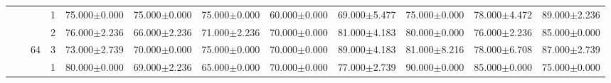 \begin{table}[htpb]
{\begin{tabular}{c|c|c|c|rr|rr|rr|rr}
                                 &                                                                                 &                                                                                        & 1                                                                                         & 75.000$\pm$0.000                        & 75.000$\pm$0.000                        & 75.000$\pm$0.000                        & 60.000$\pm$0.000                        & 69.000$\pm$5.477                         & 75.000$\pm$0.000                         & 78.000$\pm$4.472                        & 89.000$\pm$2.236                       \\
                                 &                                                                                 &                                                                                        & 2                                                                                         & 76.000$\pm$2.236                        & 66.000$\pm$2.236                        & 71.000$\pm$2.236                        & 70.000$\pm$0.000                        & 81.000$\pm$4.183                         & 80.000$\pm$0.000                         & 76.000$\pm$2.236                        & 85.000$\pm$0.000                       \\
                                 &                                                                                 & \multirow{-3}{*}{64}                                                                   & 3                                                                                         & 73.000$\pm$2.739                        & 70.000$\pm$0.000                        & 75.000$\pm$0.000                        & 70.000$\pm$0.000                        & 89.000$\pm$4.183                         & 81.000$\pm$8.216                         & 78.000$\pm$6.708                        & 87.000$\pm$2.739                       \\ \cline{3-12} 
                                 &                                                                                 &                                                                                        & 1                                                                                         & 80.000$\pm$0.000                        & 69.000$\pm$2.236                        & 65.000$\pm$0.000                        & 70.000$\pm$0.000                        & 77.000$\pm$2.739                         & 90.000$\pm$0.000                         & 85.000$\pm$0.000                        & 75.000$\pm$0.000                       \\

\end{tabular}}
\end{table}
